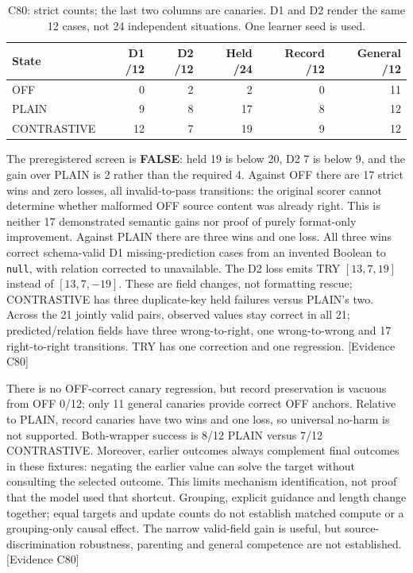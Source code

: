 \documentclass{article}
\begin{document}
\begin{table}[htbp]
\centering\small
\begin{tabular}{lrrrrr}
\toprule
State & D1 /12 & D2 /12 & Held /24 & Record /12 & General /12 \\
\midrule
OFF & 0 & 2 & 2 & 0 & 11 \\
PLAIN & 9 & 8 & 17 & 8 & 12 \\
CONTRASTIVE & 12 & 7 & 19 & 9 & 12 \\
\bottomrule
\end{tabular}
\caption{C80: strict counts; the last two columns are canaries. D1 and D2 render
the same 12 cases, not 24 independent situations. One learner seed is used.}
\label{tab:bounded-contrastive}
\end{table}

The preregistered screen is \textbf{FALSE}: held 19 is below 20, D2 7 is below 9,
and the gain over PLAIN is 2 rather than the required 4. Against OFF there are
17 strict wins and zero losses, all invalid-to-pass transitions: the original
scorer cannot determine whether malformed OFF source content was already right.
This is neither 17 demonstrated semantic gains nor proof of purely format-only
improvement. Against PLAIN there are three wins and one loss. All three wins
correct schema-valid D1 missing-prediction cases from an invented Boolean to
\texttt{null}, with relation corrected to unavailable. The D2 loss emits TRY
$[13,7,19]$ instead of $[13,7,-19]$. These are field changes, not formatting rescue;
CONTRASTIVE has three duplicate-key held failures versus PLAIN's two.
Across the 21 jointly valid pairs, observed values stay correct in all 21;
predicted/relation fields have three wrong-to-right, one wrong-to-wrong and
17 right-to-right transitions. TRY has one correction and one regression.
\textsf{[Evidence C80]}

There is no OFF-correct canary regression, but record preservation is vacuous
from OFF 0/12; only 11 general canaries provide correct OFF anchors. Relative to
PLAIN, record canaries have two wins and one loss, so universal no-harm is not
supported. Both-wrapper success is 8/12 PLAIN versus 7/12 CONTRASTIVE. Moreover,
earlier outcomes always complement final outcomes in these fixtures: negating
the earlier value can solve the target without consulting the selected outcome.
This limits mechanism identification, not proof that the model used that shortcut.
Grouping, explicit guidance and length change together; equal targets and update
counts do not establish matched compute or a grouping-only causal effect.
The narrow valid-field gain is useful, but source-discrimination robustness,
parenting and general competence are not established. \textsf{[Evidence C80]}
\end{document}
